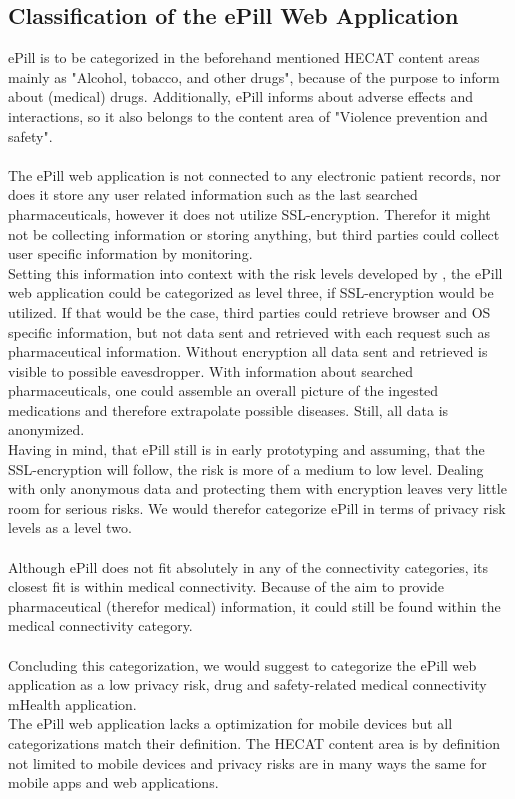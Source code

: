 \subsection{Classification of the ePill Web Application}
ePill is to be categorized in the beforehand mentioned HECAT content areas mainly as "Alcohol, tobacco, and other drugs", because of the purpose to inform about (medical) drugs. Additionally, ePill informs about adverse effects and interactions, so it also belongs to the content area of "Violence prevention and safety".
\\
\\
The ePill web application is not connected to any electronic patient records, nor does it store any user related information such as the last searched pharmaceuticals, however it does not utilize SSL-encryption. Therefor it might not be collecting information or storing anything, but third parties could collect user specific information by monitoring.
\\
Setting this information into context with the risk levels developed by \cite{Njie.2013}, the ePill web application could be categorized as level three, if SSL-encryption would be utilized. If that would be the case, third parties could retrieve browser and OS specific information, but not data sent and retrieved with each request such as pharmaceutical information. Without encryption all data sent and retrieved is visible to possible eavesdropper. With information about searched pharmaceuticals, one could assemble an overall picture of the ingested medications and therefore extrapolate possible diseases. Still, all data is anonymized.
\\
Having in mind, that ePill still is in early prototyping and assuming, that the SSL-encryption will follow, the risk is more of a medium to low level. Dealing with only anonymous data and protecting them with encryption leaves very little room for serious risks. We would therefor categorize ePill in terms of privacy risk levels as a level two.
\\
\\
Although ePill does not fit absolutely in any of the connectivity categories, its closest fit is within medical connectivity. Because of the aim to provide pharmaceutical (therefor medical) information, it could still be found within the medical connectivity category.
\\
\\
Concluding this categorization, we would suggest to categorize the ePill web application as a low privacy risk, drug and safety-related medical connectivity mHealth application.
\\
The ePill web application lacks a optimization for mobile devices but all categorizations match their definition. The HECAT content area is by definition not limited to mobile devices and privacy risks are in many ways the same for mobile apps and web applications.

